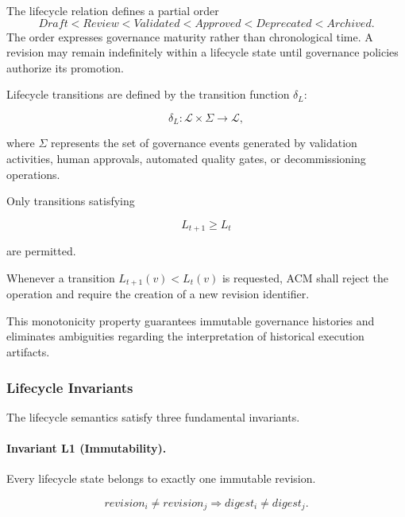 \documentclass[10pt]{article}
\begin{document}
The lifecycle relation defines a partial order
\begin{equation}
Draft
<
Review
<
Validated
<
Approved
<
Deprecated
<
Archived.
\label{eq:lifecycle_order}
\end{equation}
The order expresses governance maturity rather than chronological time. A
revision may remain indefinitely within a lifecycle state until governance
policies authorize its promotion.

Lifecycle transitions are defined by the transition function $\delta_L$:

\begin{equation}
\delta_L:
\mathcal{L}\times\Sigma
\rightarrow
\mathcal{L},
\label{eq:transition_function_lifecycle}
\end{equation}

where $\Sigma$ represents the set of governance events generated by validation
activities, human approvals, automated quality gates, or decommissioning
operations.

Only transitions satisfying

\begin{equation}
L_{t+1}
\geq
L_t
\label{eq:lifecycle_transition_rule}
\end{equation}

are permitted.

Whenever a transition $L_{t+1}(v)< L_t(v)$ is requested, ACM shall reject the operation and require the creation of a new revision identifier.

This monotonicity property guarantees immutable governance histories and
eliminates ambiguities regarding the interpretation of historical execution
artifacts.

\subsubsection{Lifecycle Invariants}

The lifecycle semantics satisfy three fundamental invariants.

\paragraph{Invariant L1 (Immutability).}

Every lifecycle state belongs to exactly one immutable revision.

\begin{equation}
revision_i
\neq
revision_j
\Longrightarrow
digest_i
\neq
digest_j.
\label{eq:immutability}
\end{equation}
\end{document}
